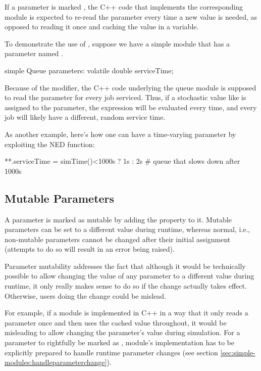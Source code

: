 If a parameter is marked , the C++ code that implements the
corresponding module is expected to re-read the parameter every time a new value
is needed, as opposed to reading it once and caching the value in a variable.

To demonstrate the use of , suppose we have a 
simple module that has a  parameter named
.

\begin{ned}
simple Queue
{
    parameters:
        volatile double serviceTime;
}
\end{ned}

Because of the  modifier, the C++ code underlying the queue
module is supposed to read the  parameter for every job
serviced. Thus, if a stochastic value like  is assigned
to the parameter, the expression will be evaluated every time, and every job
will likely have a different, random service time.

As another example, here's how one can have a time-varying parameter by
exploiting the  NED function:

\begin{inifile}
**.serviceTime = simTime()<1000s ? 1s : 2s  # queue that slows down after 1000s
\end{inifile}


\subsection{Mutable Parameters}
\label{sec:ned-lang:mutable}

A parameter is marked as mutable by adding the  property to it.
Mutable parameters can be set to a different value during runtime, whereas
normal, i.e., non-mutable parameters cannot be changed after their initial
assignment (attempts to do so will result in an error being raised).

Parameter mutability addresses the fact that although it would be technically
possible to allow changing the value of any parameter to a different value
during runtime, it only really makes sense to do so if the change actually takes
effect. Otherwise, users doing the change could be mislead.

For example, if a module is implemented in C++ in a way that it only reads a
parameter once and then uses the cached value throughout, it would be misleading
to allow changing the parameter's value during simulation. For a parameter to
rightfully be marked as , module's implementation has to be
explicitly prepared to handle runtime parameter changes (see section
\ref{sec:simple-modules:handleparameterchange}).

